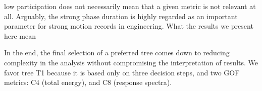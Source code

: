 low participation does not necessarily mean that a given metric is not relevant at all. Arguably, the strong phase duration is highly regarded as an important parameter for strong motion records in engineering. What the results we present here mean 

In the end, the final selection of a preferred tree comes down to reducing complexity in the analysis without compromising the interpretation of results. We favor tree T1 because it is based only on three decision steps, and two GOF metrics: C4 (total energy), and C8 (response spectra).




